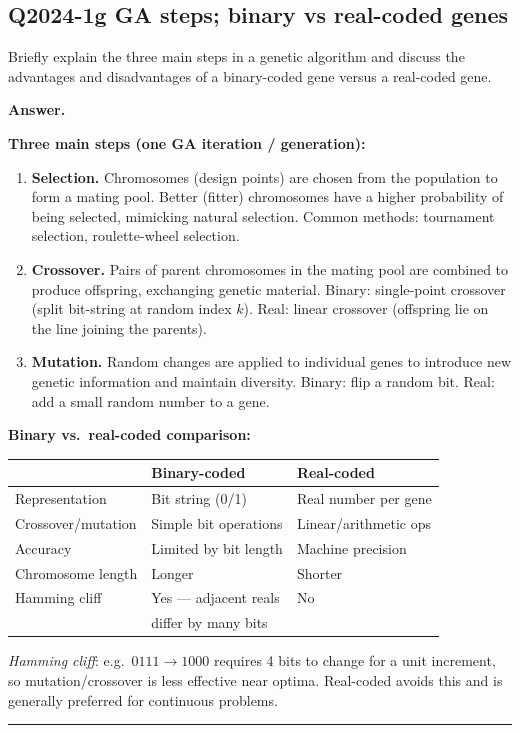 \documentclass[11pt,a4paper]{article}
\newcommand{\Q}[2]{\subsection*{Q#1 \quad #2}}
\newenvironment{answer}{\medskip\textbf{Answer.}\par}{\bigskip\hrule\bigskip}
\begin{document}

\Q{2024-1g}{[4 marks] GA steps; binary vs real-coded genes}
Briefly explain the three main steps in a genetic algorithm and discuss
the advantages and disadvantages of a binary-coded gene versus a
real-coded gene.

\begin{answer}
\textbf{Three main steps (one GA iteration / generation):}
\begin{enumerate}[leftmargin=*, label=\arabic{*}.]
  \item \textbf{Selection.}
    Chromosomes (design points) are chosen from the population to form
    a mating pool.  Better (fitter) chromosomes have a higher probability
    of being selected, mimicking natural selection.
    Common methods: tournament selection, roulette-wheel selection.

  \item \textbf{Crossover.}
    Pairs of parent chromosomes in the mating pool are combined to
    produce offspring, exchanging genetic material.
    Binary: single-point crossover (split bit-string at random index $k$).
    Real: linear crossover (offspring lie on the line joining the parents).

  \item \textbf{Mutation.}
    Random changes are applied to individual genes to introduce new
    genetic information and maintain diversity.
    Binary: flip a random bit.
    Real: add a small random number to a gene.
\end{enumerate}

\textbf{Binary vs.\ real-coded comparison:}

\begin{tabular}{@{}lll@{}}
  \toprule
  & \textbf{Binary-coded} & \textbf{Real-coded} \\
  \midrule
  Representation & Bit string (0/1) & Real number per gene \\
  Crossover/mutation & Simple bit operations & Linear/arithmetic ops \\
  Accuracy & Limited by bit length & Machine precision \\
  Chromosome length & Longer & Shorter \\
  Hamming cliff & Yes — adjacent reals & No \\
  & differ by many bits & \\
  \bottomrule
\end{tabular}

\medskip
\textit{Hamming cliff}: e.g.\ $0111 \to 1000$ requires 4 bits to change for
a unit increment, so mutation/crossover is less effective near optima.
Real-coded avoids this and is generally preferred for continuous problems.
\end{answer}
\end{document}
